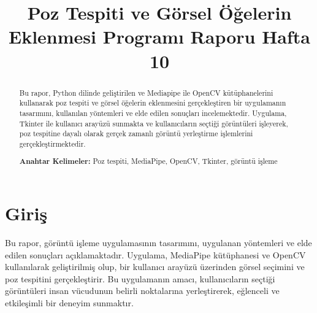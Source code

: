 \documentclass[12pt, a4paper]{article}
\begin{document}
\title{Poz Tespiti ve Görsel Öğelerin Eklenmesi 
	Programı Raporu Hafta 10}
\author{}
\date{}
\maketitle
\setcounter{section}{0}
\begin{abstract}
	\begin{justify}
	Bu rapor, Python dilinde geliştirilen ve Mediapipe ile OpenCV kütüphanelerini kullanarak poz tespiti ve görsel öğelerin eklenmesini gerçekleştiren bir uygulamanın tasarımını, kullanılan yöntemleri ve elde edilen sonuçları incelemektedir. Uygulama, Tkinter ile kullanıcı arayüzü sunmakta ve kullanıcıların seçtiği görüntüleri işleyerek, poz tespitine dayalı olarak gerçek zamanlı görüntü yerleştirme işlemlerini gerçekleştirmektedir.
	\end{justify}
	\textbf{Anahtar Kelimeler:} Poz tespiti, MediaPipe, OpenCV, Tkinter, görüntü işleme
	
	
\end{abstract}
\section{Giriş}
Bu rapor, görüntü işleme uygulamasının tasarımını, uygulanan yöntemleri ve elde edilen sonuçları açıklamaktadır. Uygulama, MediaPipe kütüphanesi ve OpenCV kullanılarak geliştirilmiş olup, bir kullanıcı arayüzü üzerinden görsel seçimini ve poz tespitini gerçekleştirir. Bu uygulamanın amacı, kullanıcıların seçtiği görüntüleri insan vücudunun belirli noktalarına yerleştirerek, eğlenceli ve etkileşimli bir deneyim sunmaktır.
\end{document}
